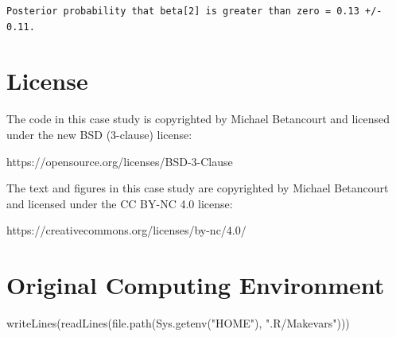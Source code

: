 \documentclass[
  letterpaper,
  DIV=11,
  numbers=noendperiod]{scrartcl}
\newenvironment{Shaded}{\begin{snugshade}}{\end{snugshade}}
\newcommand{\ControlFlowTok}[1]{\textcolor[rgb]{0.00,0.23,0.31}{#1}}
\newcommand{\DecValTok}[1]{\textcolor[rgb]{0.68,0.00,0.00}{#1}}
\newcommand{\FunctionTok}[1]{\textcolor[rgb]{0.28,0.35,0.67}{#1}}
\newcommand{\NormalTok}[1]{\textcolor[rgb]{0.00,0.23,0.31}{#1}}
\newcommand{\OtherTok}[1]{\textcolor[rgb]{0.00,0.23,0.31}{#1}}
\newcommand{\SpecialCharTok}[1]{\textcolor[rgb]{0.37,0.37,0.37}{#1}}
\newcommand{\StringTok}[1]{\textcolor[rgb]{0.13,0.47,0.30}{#1}}
\begin{document}
\begin{Shaded}
\end{Shaded}

\begin{verbatim}
Posterior probability that beta[2] is greater than zero = 0.13 +/- 0.11.
\end{verbatim}

\section*{License}\label{license}

The code in this case study is copyrighted by Michael Betancourt and
licensed under the new BSD (3-clause) license:

https://opensource.org/licenses/BSD-3-Clause

The text and figures in this case study are copyrighted by Michael
Betancourt and licensed under the CC BY-NC 4.0 license:

https://creativecommons.org/licenses/by-nc/4.0/

\section*{Original Computing
Environment}\label{original-computing-environment}

\begin{Shaded}
\begin{Highlighting}[]
\FunctionTok{writeLines}\NormalTok{(}\FunctionTok{readLines}\NormalTok{(}\FunctionTok{file.path}\NormalTok{(}\FunctionTok{Sys.getenv}\NormalTok{(}\StringTok{"HOME"}\NormalTok{), }\StringTok{".R/Makevars"}\NormalTok{)))}
\end{Highlighting}
\end{Shaded}
\end{document}
